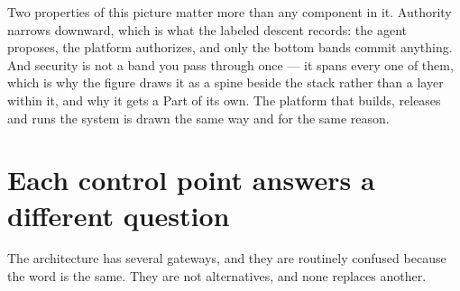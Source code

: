Two properties of this picture matter more than any component in it. Authority narrows downward, which is what the labeled descent records: the agent proposes, the platform authorizes, and only the bottom bands commit anything. And security is not a band you pass through once — it spans every one of them, which is why the figure draws it as a spine beside the stack rather than a layer within it, and why it gets a Part of its own. The platform that builds, releases and runs the system is drawn the same way and for the same reason.\par


\section{Each control point answers a different question}

The architecture has several gateways, and they are routinely confused because the word is the same. They are not alternatives, and none replaces another.\par


